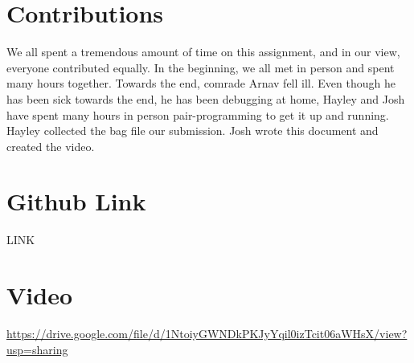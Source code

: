 \documentclass[12pt]{article}
\begin{document}
\section{Contributions}
We all spent a tremendous amount of time on this assignment, and in our view, everyone contributed equally. In the beginning, we all met in person and spent many hours together. Towards the end, comrade Arnav fell ill. Even though he has been sick towards the end, he has been debugging at home, Hayley and Josh have spent many hours in person pair-programming to get it up and running. Hayley collected the bag file our submission. Josh wrote this document and created the video.  

\section{Github Link}
LINK

\section{Video}
\url{https://drive.google.com/file/d/1NtoiyGWNDkPKJyYqil0izTcit06aWHsX/view?usp=sharing}
\end{document}

